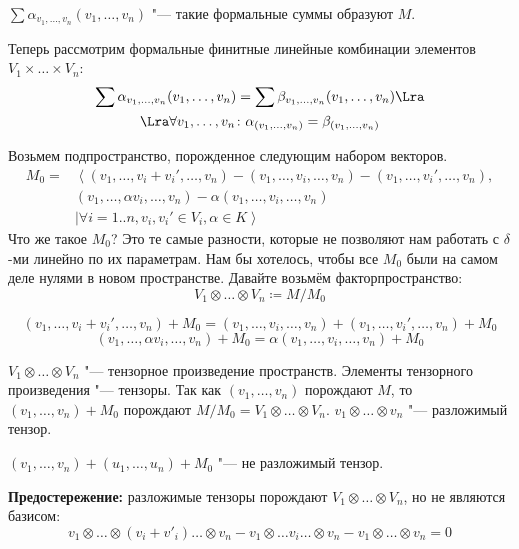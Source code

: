 \begin{description}
	$\sum \alpha_{v_1, \dots, v_n}(v_1, \dots, v_n)$ "--- такие формальные суммы образуют $M$.

	Теперь рассмотрим формальные финитные линейные комбинации элементов $V_1 \times \dots \times V_n$:
	\begin{gather*}
		\sum \alpha_{v_1, \dots, v_n}(v_1, \dots, v_n) = \sum \beta_{v_1, \dots, v_n}(v_1, \dots, v_n) \Lra \\
		\Lra \forall v_1, \dots, v_n \colon \alpha_{(v_1, \dots,  v_n)} = \beta_{(v_1, \dots, v_n)}
	\end{gather*}

	Возьмем подпространство, порожденное следующим набором векторов.
	\begin{align*}
		M_0=& \left< (v_1, \dots, v_i + v_i', \dots, v_n) - (v_1, \dots, v_i, \dots, v_n) - (v_1, \dots, v_i', \dots, v_n), \right.\\
			& (v_1, \dots, \alpha v_i, \dots, v_n) - \alpha(v_1,\dots, v_i, \dots, v_n) \\
			& \mid \left. \forall i = 1..n, v_i, v_i' \in V_i, \alpha \in K \right>
	\end{align*}
	Что же такое $M_0$? Это те самые разности, которые не позволяют нам работать с $\delta$-ми линейно по их параметрам.
	Нам бы хотелось, чтобы все $M_0$ были на самом деле нулями в новом пространстве.
	Давайте возьмём факторпространство:
	\[ V_1 \otimes \dots \otimes V_n \coloneqq M/M_0 \]

	\begin{Rem}
	$$(v_1, \dots, v_i + v_i', \dots, v_n) + M_0 = (v_1, \dots, v_i, \dots, v_n) + (v_1, \dots, v_i',\dots, v_n) + M_0$$
	$$(v_1, \dots, \alpha v_i, \dots, v_n) + M_0 = \alpha(v_1,\dots, v_i, \dots, v_n) + M_0$$
	\end{Rem}

	\begin{Def}
		$V_1 \otimes \dots \otimes V_n$ "--- тензорное произведение пространств.
		Элементы тензорного произведения "--- тензоры.
		Так как  $(v_1, \dots, v_n)$ порождают $M$,
		то $(v_1,\dots, v_n) + M_0$ порождают $M/M_0 = V_1 \otimes \dots \otimes V_n$.
		$v_1 \otimes \dots \otimes v_n$ "--- разложимый тензор.
	\end{Def}
	\begin{exmp}
		$(v_1, \dots, v_n) + (u_1, \dots, u_n) + M_0$ "--- не разложимый тензор.
	\end{exmp}
	\textbf{Предостережение:} разложимые тензоры порождают $V_1 \otimes \dots \otimes V_n$, но не являются базисом:
	\[ v_1 \otimes \dots \otimes (v_i + v'_i) \dots \otimes v_n - v_1 \otimes \dots v_i \dots \otimes v_n - v_1 \otimes \dots \otimes v_n = 0 \]


\end{description}
